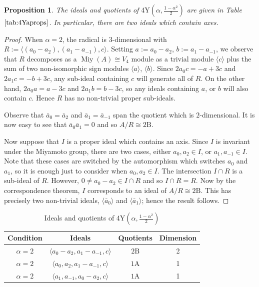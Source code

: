 \documentclass[11pt, a4paper]{article}
\theoremstyle{plain}
\newtheorem{proposition}[theorem]{Proposition}
\theoremstyle{definition}
\newcommand\al{\alpha}
\newcommand\la{\langle}
\newcommand\ra{\rangle}
\newcommand{\A}{\mathrm{A}}
\newcommand{\B}{\mathrm{B}}
\newcommand{\Y}{\mathrm{Y}}
\DeclareMathOperator{\Miy}{Miy}
\newcommand{\0}{\overline{0}}
\newcommand{\2}{\overline{2}}
\newcommand{\1}{\mathbbm{1}}
\begin{document}
\begin{proposition}
The ideals and quotients of $4\Y(\al, \frac{1-\al^2}{2})$ are given in Table $\ref{tab:4Yaprops}$. In particular, there are two ideals which contain axes.
\end{proposition}

\begin{proof}
When $\al = 2$, the radical is $3$-dimensional with $R := \la (a_0 - a_2),  (a_1 - a_{-1}),  c\ra$. Setting $a := a_0 - a_2$, $b:= a_1 - a_{-1}$, we observe that $R$ decomposes as a $\Miy(A) \cong V_4$ module as a trivial module $\la c \ra$ plus the sum of two non-isomorphic sign modules $\la a\ra$, $\la b \ra$.  Since $2a_0 c = -a+3c$ and $2a_1 c = -b+3c$, any sub-ideal containing $c$ will generate all of $R$. On the other hand, $2a_0 a = a-3c$ and $2a_1b = b-3c$, so any ideals containing $a$, or $b$ will also contain $c$.  Hence $R$ has no non-trivial proper sub-ideals.

Observe that $\bar{a}_0 = \bar{a}_2$ and $\bar{a}_1 = \bar{a}_{-1}$ span the quotient which is $2$-dimensional.  It is now easy to see that $\bar{a}_0 \bar{a}_1 = 0$ and so $A/R \cong 2\B$.

Now suppose that $I$ is a proper ideal which contains an axis.  Since $I$ is invariant under the Miyamoto group, there are two cases, either $a_0, a_2 \in I$, or $a_1,a_{-1} \in I$.  Note that these cases are switched by the automorphism which switches $a_0$ and $a_1$, so it is enough just to consider when $a_0, a_2 \in I$.  The intersection $I \cap R$ is a sub-ideal of $R$.  However, $0 \neq a_0 - a_2 \in I \cap R$ and so $I \cap R = R$.  Now by the correspondence theorem, $I$ corresponds to an ideal of $A/R \cong 2\B$.  This has precisely two non-trivial ideals, $\la \bar{a}_0 \ra$ and $\la \bar{a}_1 \ra$; hence the result follows.
\end{proof}

\begin{table}[h!tb]
	\renewcommand{\arraystretch}{1.5}
	\centering
	\footnotesize
	\begin{tabular}{c|c|c|c}
		\hline
		Condition & Ideals & Quotients & Dimension \\
		\hline
		 $\al = 2$ & $\la a_0 - a_2, a_1-a_{-1}, c \ra $ & $2\B$ & 2 \\
		 $\al = 2$ & $\la a_0, a_2, a_1-a_{-1}, c \ra $ & $1\A$ & 1 \\
		 $\al = 2$ & $\la a_1, a_{-1}, a_0 - a_2, c \ra $ & $1\A$ & 1
	\end{tabular}
	\caption{Ideals and quotients of $4\Y(\al, \frac{1-\al^2}{2})$}\label{tab:4Yaprops}
\end{table}
\end{document}
